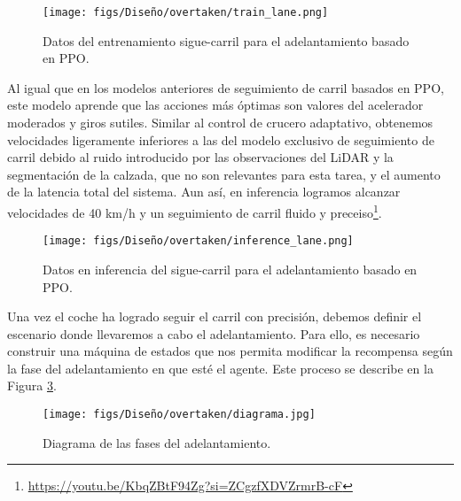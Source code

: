 \begin{figure}[ht]
\centering
\texttt{[image: figs/Diseño/overtaken/train\_lane.png]}
\caption{Datos del entrenamiento sigue-carril para el adelantamiento basado en \ac{PPO}.}
\label{fig:train_lane_overtaken}
\end{figure}

Al igual que en los modelos anteriores de seguimiento de carril basados en \ac{PPO}, este modelo aprende que las acciones más óptimas son valores del acelerador moderados y giros sutiles. Similar al control de crucero adaptativo, obtenemos velocidades ligeramente inferiores a las del modelo exclusivo de seguimiento de carril debido al ruido introducido por las observaciones del \ac{LiDAR} y la segmentación de la calzada, que no son relevantes para esta tarea, y el aumento de la latencia total del sistema. Aun así, en inferencia logramos alcanzar velocidades de 40 km/h y un seguimiento de carril fluido y preceiso\footnote{\url{https://youtu.be/KbqZBtF94Zg?si=ZCgzfXDVZrmrB-cF}}.
\begin{figure}[ht]
\centering
\texttt{[image: figs/Diseño/overtaken/inference\_lane.png]}
\caption{Datos en inferencia del sigue-carril para el adelantamiento basado en \ac{PPO}.}
\label{fig:inference_lane_overtaken}
\end{figure}

Una vez el coche ha logrado seguir el carril con precisión, debemos definir el escenario donde llevaremos a cabo el adelantamiento. Para ello, es necesario construir una máquina de estados que nos permita modificar la recompensa según la fase del adelantamiento en que esté el agente. Este proceso se describe en la Figura \ref{fig:dim _overtaken}.
\begin{figure}[ht]
\centering
\texttt{[image: figs/Diseño/overtaken/diagrama.jpg]}
\caption{Diagrama de las fases del adelantamiento.}
\label{fig:dim _overtaken}
\end{figure}

